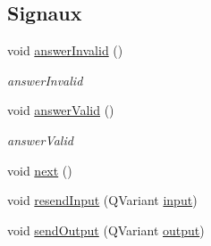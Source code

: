 \subsection*{Signaux}
\begin{DoxyCompactItemize}
\item 
void \hyperlink{classSH__QuestionState_a3348a8a683130678ac87a10ba2a25486}{answer\-Invalid} ()
\begin{DoxyCompactList}\small\item\em answer\-Invalid \end{DoxyCompactList}\item 
void \hyperlink{classSH__QuestionState_a04e259643788d15ab6244bc8a04286d6}{answer\-Valid} ()
\begin{DoxyCompactList}\small\item\em answer\-Valid \end{DoxyCompactList}\item 
void \hyperlink{classSH__GenericState_a030e67a872956135c52e6876d960a7b5}{next} ()
\item 
void \hyperlink{classSH__InOutState_afa791181eb61a18d4337a04827f9b200}{resend\-Input} (Q\-Variant \hyperlink{classSH__InOutState_a04364c76d2fd8a3781e7b325955e5bd9}{input})
\item 
void \hyperlink{classSH__InOutState_ad40e929a5537eb1d4883d5aa6eee5b15}{send\-Output} (Q\-Variant \hyperlink{classSH__InOutState_a1a2fd4f34484125058e20730aaee7e46}{output})
\end{DoxyCompactItemize}
